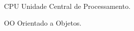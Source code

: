 \begin{siglas}
\item [CPU] Unidade Central de Processamento.
\item [OO] Orientado a Objetos.
\end{siglas}
